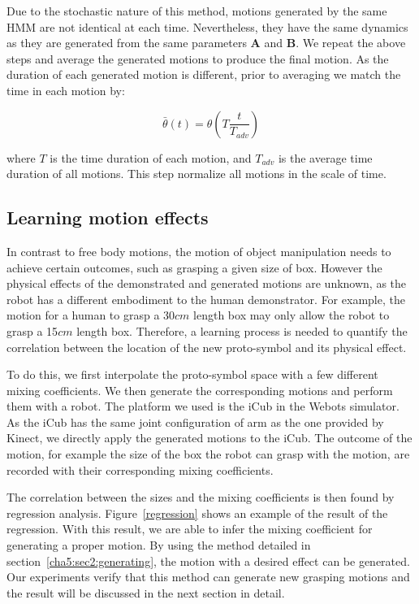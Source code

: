 Due to the stochastic nature of this method, motions generated by the same HMM are not identical at each time. Nevertheless, they have the same dynamics as they are generated from the same parameters $\boldsymbol{A}$ and $\boldsymbol{B}$. We repeat the above steps and average the generated motions to produce the final motion. As the duration of each generated motion is different, prior to averaging we match the time in each motion by:

\begin{equation}
\bar{\theta}\left(t\right)=\theta\left(T\frac{t}{T_{adv}}\right)
\end{equation}

where $T$ is the time duration of each motion, and $T_{adv}$ is the average time duration of all motions. This step normalize all motions in the scale of time.

\subsection{Learning motion effects}
\label{cha5:sec2:learning}

In contrast to free body motions, the motion of object manipulation needs to achieve certain outcomes, such as grasping a given size of box. However the physical effects of the demonstrated and generated motions are unknown, as the robot has a different embodiment to the human demonstrator. For example, the motion for a human to grasp a 30$cm$ length box may only allow the robot to grasp a 15$cm$ length box. Therefore, a learning process is needed to quantify the correlation between the location of the new proto-symbol and its physical effect.

To do this, we first interpolate the proto-symbol space with a few different mixing coefficients. We then generate the corresponding motions and perform them with a robot. The platform we used is the iCub in the Webots simulator. As the iCub has the same joint configuration of arm as the one provided by Kinect, we directly apply the generated motions to the iCub.  The outcome of the motion, for example the size of the box the robot can grasp with the motion, are recorded with their corresponding mixing coefficients.

The correlation between the sizes and the mixing coefficients is then found by regression analysis. Figure~\ref{regression} shows an example of the result of the regression. With this result, we are able to infer the mixing coefficient for generating a proper motion. By using the method detailed in section~\ref{cha5:sec2:generating}, the motion with a desired effect can be generated. Our experiments verify that this method can generate new grasping motions and the result will be discussed in the next section in detail. 